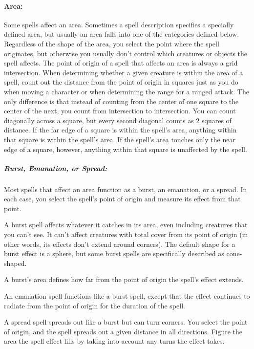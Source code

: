 \paragraph{Area:} Some spells affect an area. Sometimes a spell description specifies a specially defined area, 
but usually an area falls into one of the categories defined below.
Regardless of the shape of the area, you select the point where the spell originates, 
but otherwise you usually don't control which creatures or objects the spell affects. 
The point of origin of a spell that affects an area is always a grid intersection. 
When determining whether a given creature is within the area of a spell, 
count out the distance from the point of origin in squares just as you do when moving a character or when determining the range for a ranged attack. 
The only difference is that instead of counting from the center of one square to the center of the next, you count from intersection to intersection.
You can count diagonally across a square, but every second diagonal counts as 2 squares of distance. 
If the far edge of a square is within the spell's area, anything within that square is within the spell's area. 
If the spell's area touches only the near edge of a square, however, anything within that square is unaffected by the spell.

\subparagraph{Burst, Emanation, or Spread:} Most spells that affect an area function as a burst, an emanation, or a spread. 
In each case, you select the spell's point of origin and measure its effect from that point. 

A burst spell affects whatever it catches in its area, even including creatures that you can't see. 
It can't affect creatures with total cover from its point of origin (in other words, its effects don't extend around corners). 
The default shape for a burst effect is a sphere, but some burst spells are specifically described as cone-shaped.

A burst's area defines how far from the point of origin the spell's effect extends.

An emanation spell functions like a burst spell, except that the effect continues to radiate from the point of origin for the duration of the spell.

A spread spell spreads out like a burst but can turn corners. You select the point of origin, and the spell spreads out a given distance in all directions. 
Figure the area the spell effect fills by taking into account any turns the effect takes.

